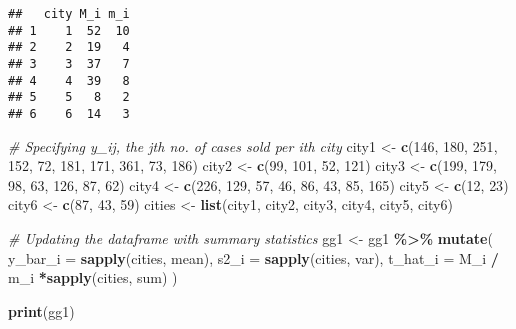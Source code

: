 \documentclass[]{article}
\newenvironment{Shaded}{\begin{snugshade}}{\end{snugshade}}
\newcommand{\AttributeTok}[1]{\textcolor[rgb]{0.13,0.29,0.53}{#1}}
\newcommand{\CommentTok}[1]{\textcolor[rgb]{0.56,0.35,0.01}{\textit{#1}}}
\newcommand{\DecValTok}[1]{\textcolor[rgb]{0.00,0.00,0.81}{#1}}
\newcommand{\FunctionTok}[1]{\textcolor[rgb]{0.13,0.29,0.53}{\textbf{#1}}}
\newcommand{\NormalTok}[1]{#1}
\newcommand{\OtherTok}[1]{\textcolor[rgb]{0.56,0.35,0.01}{#1}}
\newcommand{\SpecialCharTok}[1]{\textcolor[rgb]{0.81,0.36,0.00}{\textbf{#1}}}
\begin{document}
\begin{verbatim}
##   city M_i m_i
## 1    1  52  10
## 2    2  19   4
## 3    3  37   7
## 4    4  39   8
## 5    5   8   2
## 6    6  14   3
\end{verbatim}

\begin{Shaded}
\begin{Highlighting}[]
\CommentTok{\# Specifying y\_ij, the jth no. of cases sold per ith city}
\NormalTok{city1 }\OtherTok{\textless{}{-}} \FunctionTok{c}\NormalTok{(}\DecValTok{146}\NormalTok{, }\DecValTok{180}\NormalTok{, }\DecValTok{251}\NormalTok{, }\DecValTok{152}\NormalTok{, }\DecValTok{72}\NormalTok{, }\DecValTok{181}\NormalTok{, }\DecValTok{171}\NormalTok{, }\DecValTok{361}\NormalTok{, }\DecValTok{73}\NormalTok{, }\DecValTok{186}\NormalTok{)}
\NormalTok{city2 }\OtherTok{\textless{}{-}} \FunctionTok{c}\NormalTok{(}\DecValTok{99}\NormalTok{, }\DecValTok{101}\NormalTok{, }\DecValTok{52}\NormalTok{, }\DecValTok{121}\NormalTok{)}
\NormalTok{city3 }\OtherTok{\textless{}{-}} \FunctionTok{c}\NormalTok{(}\DecValTok{199}\NormalTok{, }\DecValTok{179}\NormalTok{, }\DecValTok{98}\NormalTok{, }\DecValTok{63}\NormalTok{, }\DecValTok{126}\NormalTok{, }\DecValTok{87}\NormalTok{, }\DecValTok{62}\NormalTok{)}
\NormalTok{city4 }\OtherTok{\textless{}{-}} \FunctionTok{c}\NormalTok{(}\DecValTok{226}\NormalTok{, }\DecValTok{129}\NormalTok{, }\DecValTok{57}\NormalTok{, }\DecValTok{46}\NormalTok{, }\DecValTok{86}\NormalTok{, }\DecValTok{43}\NormalTok{, }\DecValTok{85}\NormalTok{, }\DecValTok{165}\NormalTok{)}
\NormalTok{city5 }\OtherTok{\textless{}{-}} \FunctionTok{c}\NormalTok{(}\DecValTok{12}\NormalTok{, }\DecValTok{23}\NormalTok{)}
\NormalTok{city6 }\OtherTok{\textless{}{-}} \FunctionTok{c}\NormalTok{(}\DecValTok{87}\NormalTok{, }\DecValTok{43}\NormalTok{, }\DecValTok{59}\NormalTok{)}
\NormalTok{cities }\OtherTok{\textless{}{-}} \FunctionTok{list}\NormalTok{(city1, city2, city3, city4, city5, city6)}

\CommentTok{\# Updating the dataframe with summary statistics  }
\NormalTok{gg1 }\OtherTok{\textless{}{-}}\NormalTok{ gg1 }\SpecialCharTok{\%\textgreater{}\%}
  \FunctionTok{mutate}\NormalTok{(}
    \AttributeTok{y\_bar\_i =} \FunctionTok{sapply}\NormalTok{(cities, mean),}
    \AttributeTok{s2\_i =} \FunctionTok{sapply}\NormalTok{(cities, var),}
    \AttributeTok{t\_hat\_i =}\NormalTok{ M\_i }\SpecialCharTok{/}\NormalTok{ m\_i }\SpecialCharTok{*}\FunctionTok{sapply}\NormalTok{(cities, sum)}
\NormalTok{  )}

\FunctionTok{print}\NormalTok{(gg1)}
\end{Highlighting}
\end{Shaded}
\end{document}
